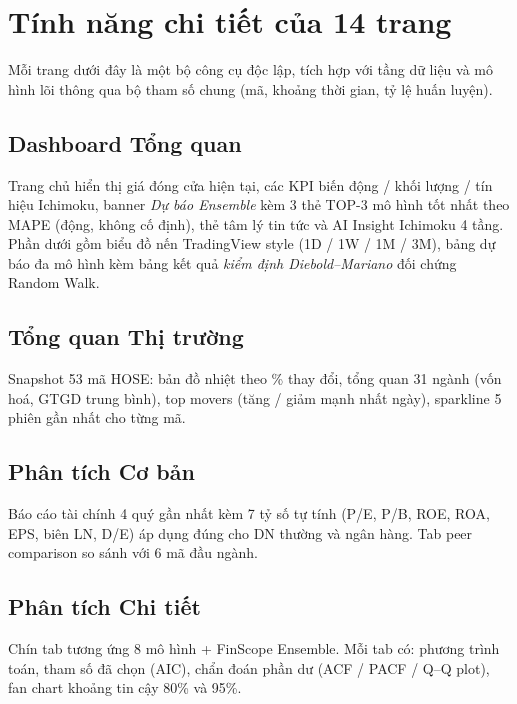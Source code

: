 \documentclass[12pt,a4paper,openany,oneside]{report}
\numberwithin{equation}{chapter}
\begin{document}
\chapter{Tính năng chi tiết của 14 trang}

\indent Mỗi trang dưới đây là một bộ công cụ độc lập, tích hợp với tầng
dữ liệu và mô hình lõi thông qua bộ tham số chung (mã, khoảng thời gian,
tỷ lệ huấn luyện).

\section{Dashboard Tổng quan}

\indent Trang chủ hiển thị giá đóng cửa hiện tại, các KPI biến động /
khối lượng / tín hiệu Ichimoku, banner \emph{Dự báo Ensemble} kèm 3 thẻ
TOP-3 mô hình tốt nhất theo MAPE (động, không cố định), thẻ tâm lý tin
tức và AI Insight Ichimoku 4 tầng. Phần dưới gồm biểu đồ nến TradingView
style (1D / 1W / 1M / 3M), bảng dự báo đa mô hình kèm bảng kết quả
\emph{kiểm định Diebold--Mariano} đối chứng Random Walk.

\section{Tổng quan Thị trường}

\indent Snapshot 53 mã HOSE: bản đồ nhiệt theo \% thay đổi, tổng quan 31
ngành (vốn hoá, GTGD trung bình), top movers (tăng / giảm mạnh nhất ngày),
sparkline 5 phiên gần nhất cho từng mã.

\section{Phân tích Cơ bản}

\indent Báo cáo tài chính 4 quý gần nhất kèm 7 tỷ số tự tính (P/E, P/B,
ROE, ROA, EPS, biên LN, D/E) áp dụng đúng cho DN thường và ngân hàng.
Tab peer comparison so sánh với 6 mã đầu ngành.

\section{Phân tích Chi tiết}

\indent Chín tab tương ứng 8 mô hình + FinScope Ensemble. Mỗi tab có:
phương trình toán, tham số đã chọn (AIC), chẩn đoán phần dư (ACF /
PACF / Q--Q plot), fan chart khoảng tin cậy 80\% và 95\%.
\end{document}
